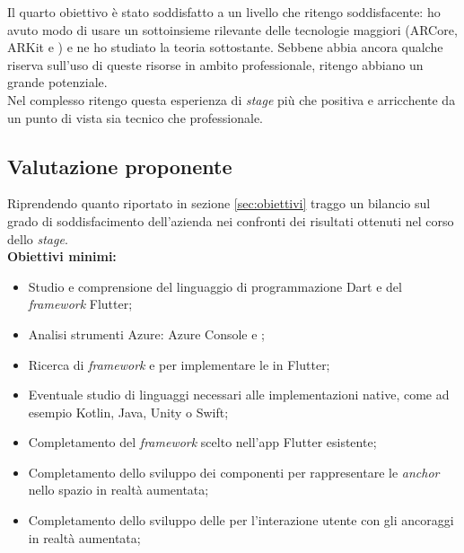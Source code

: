 Il quarto obiettivo è stato soddisfatto a un livello che ritengo soddisfacente: ho avuto modo di usare un sottoinsieme rilevante delle tecnologie maggiori (ARCore, ARKit e \asa{}) e ne ho studiato la teoria sottostante. Sebbene abbia ancora qualche riserva sull'uso di queste risorse in ambito professionale, ritengo abbiano un grande potenziale.\\
Nel complesso ritengo questa esperienza di \textit{stage} più che positiva e arricchente da un punto di vista sia tecnico che professionale.

\subsection{Valutazione proponente}
Riprendendo quanto riportato in sezione \ref{sec:obiettivi} traggo un bilancio sul grado di soddisfacimento dell'azienda nei confronti dei risultati ottenuti nel corso dello \textit{stage}.\\
\textbf{Obiettivi minimi:}\\

\begin{itemize}
  \item Studio e comprensione del linguaggio di programmazione Dart e del \textit{framework} Flutter;
\end{itemize}
\begin{itemize}
  \item Analisi strumenti Azure: Azure Console e \asa{};
\end{itemize}
\begin{itemize}
  \item Ricerca di \textit{framework} e \sdk{} per implementare le \asa{} in Flutter;
\end{itemize}
\begin{itemize}
  \item Eventuale studio di linguaggi necessari alle implementazioni native, come ad esempio Kotlin, Java, Unity o Swift;
\end{itemize}
\begin{itemize}
  \item Completamento del \textit{framework} scelto nell'app Flutter esistente;
\end{itemize}
\begin{itemize}
  \item Completamento dello sviluppo dei componenti per rappresentare le \textit{anchor} nello spazio in realtà aumentata;
\end{itemize}
\begin{itemize}
  \item Completamento dello sviluppo delle \api{} per l'interazione utente con gli ancoraggi in realtà aumentata;
\end{itemize}




